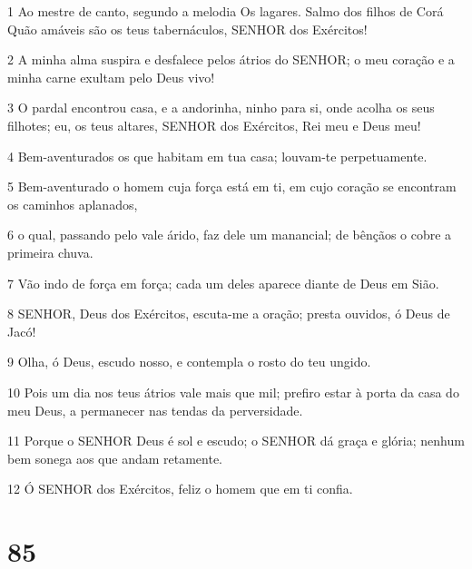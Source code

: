 \par 1 Ao mestre de canto, segundo a melodia Os lagares. Salmo dos filhos de Corá Quão amáveis são os teus tabernáculos, SENHOR dos Exércitos!
\par 2 A minha alma suspira e desfalece pelos átrios do SENHOR; o meu coração e a minha carne exultam pelo Deus vivo!
\par 3 O pardal encontrou casa, e a andorinha, ninho para si, onde acolha os seus filhotes; eu, os teus altares, SENHOR dos Exércitos, Rei meu e Deus meu!
\par 4 Bem-aventurados os que habitam em tua casa; louvam-te perpetuamente.
\par 5 Bem-aventurado o homem cuja força está em ti, em cujo coração se encontram os caminhos aplanados,
\par 6 o qual, passando pelo vale árido, faz dele um manancial; de bênçãos o cobre a primeira chuva.
\par 7 Vão indo de força em força; cada um deles aparece diante de Deus em Sião.
\par 8 SENHOR, Deus dos Exércitos, escuta-me a oração; presta ouvidos, ó Deus de Jacó!
\par 9 Olha, ó Deus, escudo nosso, e contempla o rosto do teu ungido.
\par 10 Pois um dia nos teus átrios vale mais que mil; prefiro estar à porta da casa do meu Deus, a permanecer nas tendas da perversidade.
\par 11 Porque o SENHOR Deus é sol e escudo; o SENHOR dá graça e glória; nenhum bem sonega aos que andam retamente.
\par 12 Ó SENHOR dos Exércitos, feliz o homem que em ti confia.

\chapter{85}

